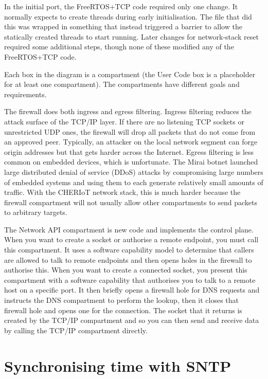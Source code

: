 In the initial port, the FreeRTOS+TCP code required only one change.
It normally expects to create threads during early initialisation.
The file that did this was wrapped in something that instead triggered a barrier to allow the statically created threads to start running.
Later changes for network-stack reset required some additional steps, though none of these modified any of the FreeRTOS+TCP code.

Each box in the diagram is a compartment (the User Code box is a placeholder for at least one compartment).
The compartments have different goals and requirements.

The firewall does both ingress and egress filtering.
Ingress filtering reduces the attack surface of the TCP/IP layer.
If there are no listening TCP sockets or unrestricted UDP ones, the firewall will drop all packets that do not come from an approved peer.
Typically, an attacker on the local network segment can forge origin addresses but that gets harder across the Internet.
Egress filtering is less common on embedded devices, which is unfortunate.
The Mirai botnet launched large distributed denial of service (DDoS) attacks by compromising large numbers of embedded systems and using them to each generate relatively small amounts of traffic.
With the CHERIoT network stack, this is much harder because the firewall compartment will not usually allow other compartments to send packets to arbitrary targets.

The Network API compartment is new code and implements the control plane.
When you want to create a socket or authorise a remote endpoint, you must call this compartment.
It uses a software capability model to determine that callers are allowed to talk to remote endpoints and then opens holes in the firewall to authorise this.
When you want to create a connected socket, you present this compartment with a software capability that authorises you to talk to a remote host on a specific port.
It then briefly opens a firewall hole for DNS requests and instructs the DNS compartment to perform the lookup, then it closes that firewall hole and opens one for the connection.
The socket that it returns is created by the TCP/IP compartment and so you can then send and receive data by calling the TCP/IP compartment directly.

\section{Synchronising time with SNTP}

